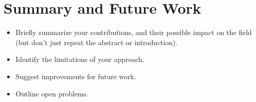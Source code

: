 \documentclass[10pt]{article}
\begin{document}
\section{Summary and Future Work}
\begin{itemize}
\item Briefly summarize your contributions, and their possible
impact on the field (but don't just repeat the abstract or introduction).
\item Identify the limitations of your approach.
\item Suggest improvements for future work.
\item Outline open problems.
\end{itemize}

\vfill\pagebreak

	
	


\end{document}
